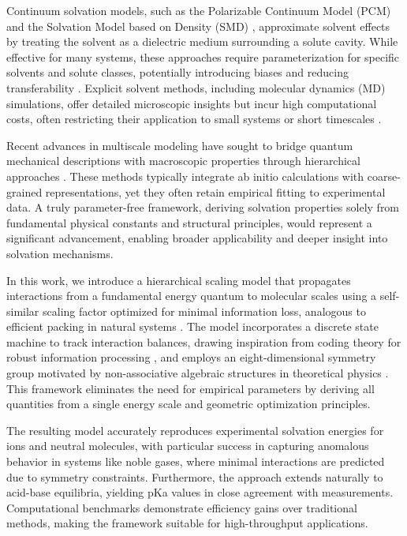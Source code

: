 \documentclass[twocolumn,prd,amsmath,amssymb,aps,superscriptaddress,nofootinbib]{revtex4-2}
\begin{document}
Continuum solvation models, such as the Polarizable Continuum Model (PCM) \cite{Tomasi1994} and the Solvation Model based on Density (SMD) \cite{Marenich2009}, approximate solvent effects by treating the solvent as a dielectric medium surrounding a solute cavity. While effective for many systems, these approaches require parameterization for specific solvents and solute classes, potentially introducing biases and reducing transferability \cite{Duong2018}. Explicit solvent methods, including molecular dynamics (MD) simulations, offer detailed microscopic insights but incur high computational costs, often restricting their application to small systems or short timescales \cite{Genheden2015}.

Recent advances in multiscale modeling have sought to bridge quantum mechanical descriptions with macroscopic properties through hierarchical approaches \cite{Severini2020}. These methods typically integrate ab initio calculations with coarse-grained representations, yet they often retain empirical fitting to experimental data. A truly parameter-free framework, deriving solvation properties solely from fundamental physical constants and structural principles, would represent a significant advancement, enabling broader applicability and deeper insight into solvation mechanisms.

In this work, we introduce a hierarchical scaling model that propagates interactions from a fundamental energy quantum to molecular scales using a self-similar scaling factor optimized for minimal information loss, analogous to efficient packing in natural systems \cite{Conway1999}. The model incorporates a discrete state machine to track interaction balances, drawing inspiration from coding theory for robust information processing \cite{MacWilliams1977}, and employs an eight-dimensional symmetry group motivated by non-associative algebraic structures in theoretical physics \cite{Baez2002}. This framework eliminates the need for empirical parameters by deriving all quantities from a single energy scale and geometric optimization principles.

The resulting model accurately reproduces experimental solvation energies for ions and neutral molecules, with particular success in capturing anomalous behavior in systems like noble gases, where minimal interactions are predicted due to symmetry constraints. Furthermore, the approach extends naturally to acid-base equilibria, yielding pKa values in close agreement with measurements. Computational benchmarks demonstrate efficiency gains over traditional methods, making the framework suitable for high-throughput applications.
\end{document}

